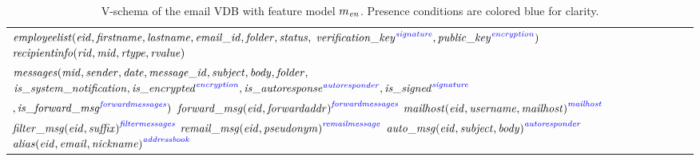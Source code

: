 \begin{table*}
\caption{V-schema of the email VDB with feature model
\ensuremath{\fModel_\enron}. 
Presence conditions are colored blue for clarity.
}
\vspace{-8pt}
\label{tab:enron-vsch}
\small
\begin{tabular} {|l|}
\hline 
$\employees(\eid, \fname, \lname, \emailid, \folder, \status,$ 
$\annot[\fsignature]{\verificationkey},
  \annot[\fencryption]{\publickey})$ \hspace{20pt}
 $\recipientinfo(\rid, \midatt, \rtype, \rvalue)$ 
  \\ %
$\messages(\midatt, \sender, \dateatt, \messageid, \subject, \body, \folder,$ 
$\issystemnotification,
  \annot[\fencryption]{\isencrypted}, 
  \annot[\fautoresponder]{\isautoresponse},\annot[\fsignature]{\issigned} $ 
  \\ \hspace{30pt} 
  $,
  \annot[\fforwardmsg]{\isforwardmsg})$  \hspace{40pt}
${\forwardmsg(\eid, \forwardaddr)}^{\fforwardmsg} $\hspace{40pt}
${\mailhost(\eid, \username, \mailhost)}^{\fmailhost}$ 
\\
  ${\filtermsg(\eid, \suffix)}^{\ffiltermsg} $ \hspace{3pt}
${\remailmsg(\eid, \pseudonym)}^{\fremailmsg}$    \hspace{3pt}
${\automsg(\eid, \subject, \body)}^{\fautoresponder} $  \hspace{3pt}
${\alias(\eid, \emailAtt, \nickname)}^{\faddressbook}$\\
\hline
\end{tabular}
\vspace{-13pt}
\end{table*}


